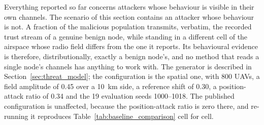 \documentclass[notspecified,article,submit,moreauthors]{Definitions/mdpi}
\begin{document}
Everything reported so far concerns attackers whose behaviour is visible in their own channels. The scenario of this section contains an attacker whose behaviour is not. A fraction of the malicious population transmits, verbatim, the recorded trust stream of a genuine benign node, while standing in a different cell of the airspace whose radio field differs from the one it reports. Its behavioural evidence is therefore, distributionally, exactly a benign node's, and no method that reads a single node's channels has anything to work with. The generator is described in Section~\ref{sec:threat_model}; the configuration is the spatial one, with 800 UAVs, a field amplitude of 0.45 over a 10~km side, a reference shift of 0.30, a position-attack ratio of 0.34 and the 19 evaluation seeds 1000--1018. The published configuration is unaffected, because the position-attack ratio is zero there, and re-running it reproduces Table~\ref{tab:baseline_comparison} cell for cell.
\end{document}
